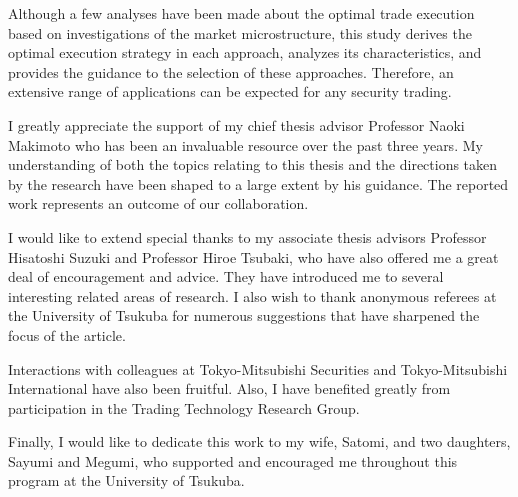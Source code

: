 \documentclass[a4paper,openany]{book}
\begin{document}
Although a few analyses have been made about the optimal trade execution based on investigations of the market microstructure, this study derives the optimal execution strategy in each approach, analyzes its characteristics, and provides the guidance to the selection of these approaches.  Therefore, an extensive range of applications can be expected for any security trading.

%

\newpage


\vspace*{1cm}

\noindent I greatly appreciate the support of my chief thesis advisor Professor Naoki Makimoto who has been an invaluable resource over the past three years.  My understanding of both the topics relating to this thesis and the directions taken by the research have been shaped to a large extent by his guidance.  The reported work represents an outcome of our collaboration.

I would like to extend special thanks to my associate thesis advisors Professor Hisatoshi Suzuki and Professor Hiroe Tsubaki, who have also offered me a great deal of encouragement and advice.  They have introduced me to several interesting related areas of research.  I also wish to thank anonymous referees at the University of Tsukuba for numerous suggestions that have sharpened the focus of the article.

Interactions with colleagues at Tokyo-Mitsubishi Securities and Tokyo-Mitsubishi International have also been fruitful.  Also, I have benefited greatly from participation in the Trading Technology Research Group.

Finally, I would like to dedicate this work to my wife, Satomi, and two daughters, Sayumi and Megumi, who supported and encouraged me throughout this program at the University of Tsukuba.


\tableofcontents
\listoffigures
\listoftables









\end{document}
